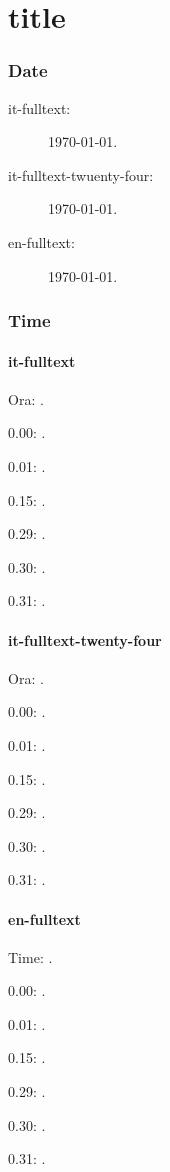 \documentclass[italian,english]{article}
\begin{document}
\part{title}\section{Date}

\begin{description}
\item[it-fulltext:]
\today.
\item[it-fulltext-twuenty-four:]
\today.
\item[en-fulltext:]
\today.

\end{description}

\section{Time}
\subsection{it-fulltext}
Ora: \DTMcurrenttime.

0.00:  .

0.01:   . 

0.15:   . 

0.29:   . 

0.30:   .

0.31:   .
\subsection{it-fulltext-twenty-four}
Ora: \DTMcurrenttime.

0.00:  .

0.01:   . 

0.15:   . 

0.29:   . 

0.30:   .

0.31:   .
\subsection{en-fulltext}
Time: \DTMcurrenttime.

0.00:  .

0.01:   . 

0.15:   . 

0.29:   . 

0.30:   .

0.31:   .
\end{document}

